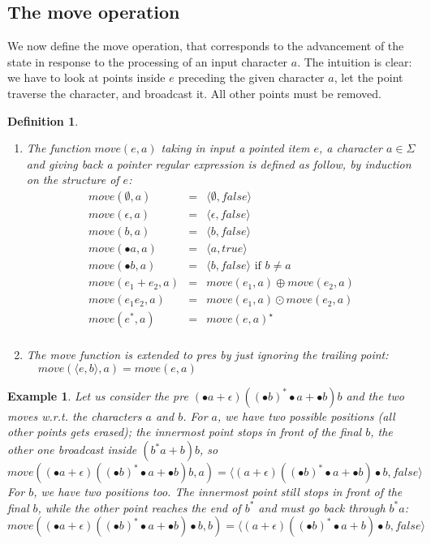 \documentclass[preprint]{sigplanconf}
\newcommand{\true}{\mathit{true}}
\newcommand{\false}{\mathit{false}}
\newcommand{\varoast}{\star}
\newcounter{item}
\newtheorem{definition}[item]{Definition}
\newtheorem{example}[item]{Example}
\begin{document}
\subsection{The move operation}
We now define the move operation, that corresponds to the 
advancement of the state in response to the processing of
an input character $a$. The intuition is clear: we have to
look at points inside $e$ preceding the given character $a$,
let the point traverse the character, and broadcast it. 
All other points must be removed.

\begin{definition}\label{move}\
\begin{enumerate}
\item The function $move(e,a)$ taking in input a pointed item 
$e$, a character $a \in \Sigma$ and giving back a pointer regular
expression is defined as follow, by induction on the structure of
$e$: 
\[
\begin{array}{rcl}
move(\emptyset,a)&=& \langle \emptyset,\false \rangle\\
move(\epsilon,a) &=& \langle \epsilon,\false\rangle\\
move(b,a) &=& \langle b,\false\rangle\\
move(\bullet a,a) &=& \langle a,\true\rangle \\
move(\bullet b,a) &=& \langle b,\false\rangle \mbox{ if } b\neq a\\
move(e_1 + e_2,a) &=& move(e_1,a) \oplus move(e_2,a)\\
move(e_1e_2,a) &=& move(e_1,a) \odot move(e_2,a) \\
move(e^*,a) &=& move(e,a)^\varoast \\
\end{array}
\]
\item The move function is extended to pres by just ignoring the trailing
point: 
$\quad move(\langle e,b\rangle,a) = move(e,a)$
\end{enumerate}
\end{definition}

\begin{example}
Let us consider the pre 
$(\bullet a + \epsilon)((\bullet b)^*\bullet a + \bullet b) b$
and the two moves w.r.t. the characters
$a$ and $b$. For $a$, we have two possible positions (all other
points gets erased); the innermost point stops in front of the final $b$,
the other one broadcast inside  $(b^*a + b) b$, so 
\[
move(
(\bullet a + \epsilon)((\bullet b)^*\bullet a + \bullet b)b ,a)
=
\langle (a + \epsilon)((\bullet b)^*\bullet a + \bullet b)\bullet b, \false \rangle
\]
For $b$, we have two positions too. The innermost point still
stops in front of the final $b$, while the other point reaches the end
of $b^*$ and must go back through  $b^*a$:
\[
move(
(\bullet a + \epsilon)((\bullet b)^*\bullet a + \bullet b)\bullet b ,b)
=
\langle (a + \epsilon)((\bullet b)^*\bullet a + b)\bullet b, \false \rangle
\]
\end{example}
\end{document}

